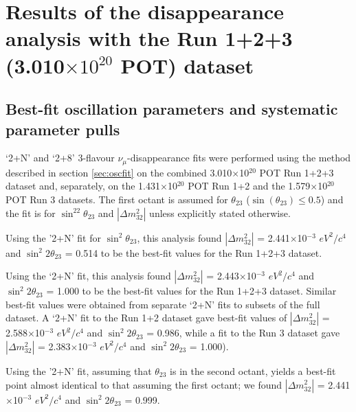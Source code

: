 \clearpage

\section {Results of the disappearance analysis with the Run 1+2+3 (3.010$\times10^{20}$ POT) dataset}
\label{sec:results}


\subsection {Best-fit oscillation parameters and systematic parameter pulls}
\label{sec:results_bestfit}

`2+N' and `2+8' 3-flavour $\nu_{\mu}$-disappearance fits were performed using the method described in 
section \ref{sec:oscfit} on the combined 3.010$\times$10$^{20}$ POT Run 1+2+3 dataset
and, separately, on the 1.431$\times$10$^{20}$ POT Run 1+2 and the 1.579$\times$10$^{20}$ POT Run 3 datasets.
The first octant is assumed for $\theta_{23}$ ($\sin(\theta_{23}) \leq 0.5$)
and the fit is for $\sin^22\theta_{23}$ and $|\Delta m^2_{32}|$ unless explicitly stated
otherwise.

Using the '2+N' fit for $\sin^2\theta_{23}$, this analysis found
$|\Delta m^{2}_{32}|$ = 2.441$\times$10$^{-3}$ $eV^{2}/c^{4}$ and
$\sin^{2}2\theta_{23}$ = 0.514
to be the best-fit values for the Run 1+2+3 dataset.

Using the `2+N' fit, this analysis found
$|\Delta m^{2}_{32}|$ = 2.443$\times$10$^{-3}$ $eV^{2}/c^{4}$ and
$\sin^{2}2\theta_{23}$ = 1.000
to be the best-fit values for the Run 1+2+3 dataset.
Similar best-fit values were obtained from separate `2+N' fits to subsets of the full dataset. A `2+N' fit 
to the Run 1+2 dataset gave best-fit values of $|\Delta m^{2}_{32}|$ = 2.588$\times$10$^{-3}$ $eV^{2}/c^{4}$ 
and $\sin^{2}2\theta_{23}$ = 0.986, while a fit to the Run 3 dataset gave $|\Delta m^{2}_{32}|$ = 
2.383$\times$10$^{-3}$ $eV^{2}/c^{4}$ and $\sin^{2}2\theta_{23}$ = 1.000).

Using the '2+N' fit, assuming that $\theta_{23}$ is in the second octant, yields a best-fit point almost identical to that assuming the
first octant; we found
$|\Delta m^{2}_{32}|$ = 2.441$\times$10$^{-3}$ $eV^{2}/c^{4}$ and
$\sin^{2}2\theta_{23}$ = 0.999.

